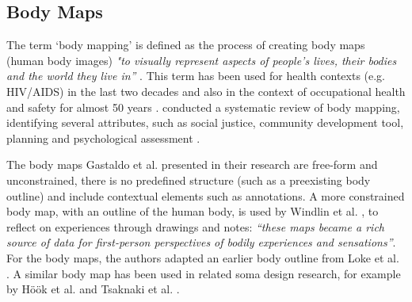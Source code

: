 \subsection{Body Maps}

The term ‘body mapping’ is defined as the process of creating body maps (human body images) \textit{"to visually represent aspects of people's lives, their bodies and the world they live in”} \cite{gastaldo_body-map_2012}. This term has been used for health contexts (e.g. HIV/AIDS) in the last two decades and also in the context of occupational health and safety for almost 50 years \cite{gastaldo_body-map_2012}. \citeauthor{de_jager_embodied_2016} conducted a systematic review of body mapping, identifying several attributes, such as social justice, community development tool, planning and psychological assessment \cite{de_jager_embodied_2016}.


The body maps Gastaldo et al. presented in their research are free-form and unconstrained, there is no predefined structure (such as a preexisting body outline) and include contextual elements such as annotations. A more constrained body map, with an outline of the human body, is used by Windlin et al. \cite{windlin_soma_2019}, to reflect on experiences through drawings and notes: \textit{“these maps became a rich source of data for first-person perspectives of bodily experiences and sensations”}. For the body maps, the authors adapted an earlier body outline from Loke et al. \cite{loke_bodily_2012}. A similar body map has been used in related soma design research, for example by Höök et al. \cite{hook_soma_2019} and Tsaknaki et al. \cite{tsaknaki_teaching_2019}.  

